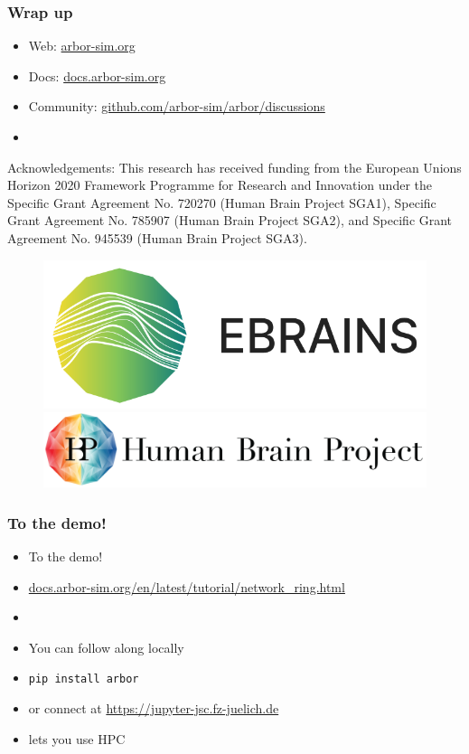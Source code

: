 \documentclass[t]{beamer}
\begin{document}
\begin{frame}
    \frametitle{Wrap up}
    \begin{itemize}
        \item Web: \url{arbor-sim.org}
        \item Docs: \url{docs.arbor-sim.org}
        \item Community: \url{github.com/arbor-sim/arbor/discussions}
        \item[]
    \end{itemize}

    { \scriptsize Acknowledgements: This research has received funding from the European Unions
    Horizon 2020 Framework Programme for Research and
    Innovation under the Specific Grant Agreement No. 720270
    (Human Brain Project SGA1), Specific Grant Agreement No.
    785907 (Human Brain Project SGA2), and Specific Grant
    Agreement No. 945539 (Human Brain Project SGA3). }
    \newline
    \begin{figure}[h]
        \begin{center}
            \includegraphics[width=0.2\linewidth]{ebrains_logo.png}
            \hspace{2em}
            \includegraphics[width=0.4\linewidth]{HBP_logo.jpg}
        \end{center}
    \end{figure}
\end{frame}

\begin{frame}
    \frametitle{To the demo!}
    \begin{itemize}
    \item To the demo!
    \item \url{docs.arbor-sim.org/en/latest/tutorial/network_ring.html}
    \item[]
    \item You can follow along locally
    \item[] \texttt{pip install arbor}
    \item or connect at \url{https://jupyter-jsc.fz-juelich.de}
    \item[] lets you use HPC
    \end{itemize}
\end{frame}
\end{document}
